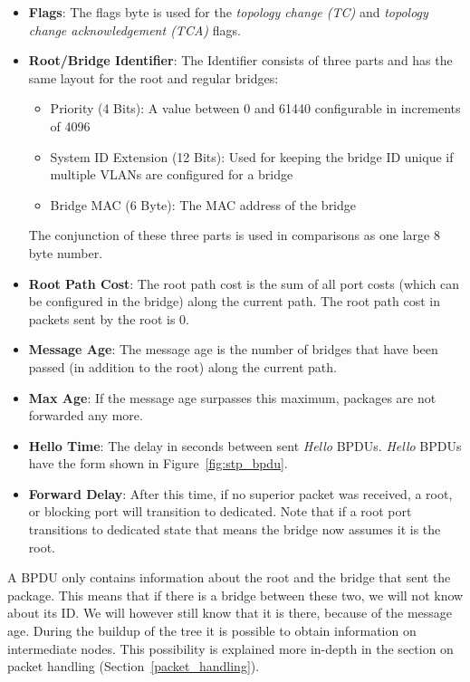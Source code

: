 \begin{itemize}
    \item \textbf{Flags}: The flags byte is used for the \textit{topology change (TC)} and \textit{topology change acknowledgement (TCA)} flags.
    \item \textbf{Root/Bridge Identifier}: The Identifier consists of three parts and has the same layout for the root and regular bridges:
        \begin{itemize}
            \item Priority (4 Bits): A value between 0 and 61440 configurable in increments of 4096
            \item System ID Extension (12 Bits): Used for keeping the bridge ID unique if multiple VLANs are configured for a bridge
            \item Bridge MAC (6 Byte): The MAC address of the bridge
        \end{itemize}
        The conjunction of these three parts is used in comparisons as one large 8 byte number.
    \item \textbf{Root Path Cost}: The root path cost is the sum of all port costs (which can be configured in the bridge) along the current path. The root path cost in packets sent by the root is 0.
    \item \textbf{Message Age}: The message age is the number of bridges that have been passed (in addition to the root) along the current path.
    \item \textbf{Max Age}: If the message age surpasses this maximum, packages are not forwarded any more.
    \item \textbf{Hello Time}: The delay in seconds between sent \textit{Hello} BPDUs.
        \textit{Hello} BPDUs have the form shown in Figure~\ref{fig:stp_bpdu}.
    \item \textbf{Forward Delay}: After this time, if no superior packet was received, a root, or blocking port will transition to dedicated.
        Note that if a root port transitions to dedicated state that means the bridge now assumes it is the root.
\end{itemize}
A BPDU only contains information about the root and the bridge that sent the package.
This means that if there is a bridge between these two, we will not know about its ID.
We will however still know that it is there, because of the message age.
During the buildup of the tree it is possible to obtain information on intermediate nodes.
This possibility is explained more in-depth in the section on packet handling (Section~\ref{packet_handling}).

